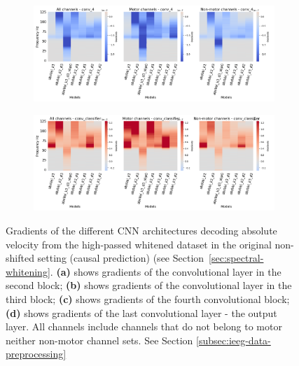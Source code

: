 \begin{figure}[!htbp]\ContinuedFloat
\begin{subfigure}[b]{\textwidth}
   \includegraphics[width=1\linewidth]{img/appendix/D/conv-4/hp-m/absVel_model_gradients_all_kinds}
   \caption{}
   \label{fig:absVel-pw-hp-grads-conv-4}
\end{subfigure}

\begin{subfigure}[b]{\textwidth}
   \includegraphics[width=1\linewidth]{img/appendix/D/conv-classifier/hp-m/absVel_model_gradients_all_kinds}
   \caption{}
   \label{fig:absVel-pw-hp-grads-conv-classifier}
\end{subfigure}

\caption[]{Gradients of the different CNN architectures decoding absolute velocity from the high-passed whitened dataset in the original non-shifted setting (causal prediction) (see Section~\ref{sec:spectral-whitening}. \textbf{(a)} shows gradients of the convolutional layer in the second block; \textbf{(b)} shows gradients of the convolutional layer in the third block; \textbf{(c)} shows gradients of the fourth convolutional block; \textbf{(d)} shows gradients of the last convolutional layer - the output layer. All channels include channels that do not belong to motor neither non-motor channel sets. See Section \ref{subsec:ieeg-data-preprocessing}}
\label{fig:absVel-pw-hp-grads}
\end{figure}